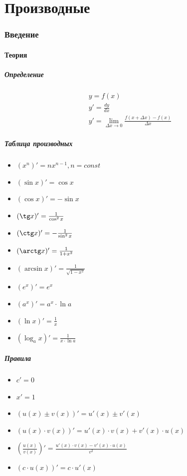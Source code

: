 \documentclass{article}
\begin{document}
\newpage
\part{Производные}

\section{Введение}

\subsection{Теория}

\subsubsection{Определение}
\begin{gather*}
    y = f(x) \\
    y' = \frac{dy}{dx} \\
    y' = \lim_{\Delta x \to 0} \frac{f(x + \Delta x) - f(x)}{\Delta x}
\end{gather*}

\subsubsection{Таблица производных}
\begin{itemize}
    \item $(x^n)' = nx^{n - 1}, n = const$
    \item $(\sin x)' = \cos x$
    \item $(\cos x)' = -\sin x$
    \item $(\tg x)'= \frac{1}{\cos^2 x}$
    \item $(\ctg x)'= - \frac{1}{\sin^2 x}$
    \item $(\arctg x)' = \frac{1}{1 + x^2}$
    \item $(\arcsin x)' = \frac{1}{\sqrt{1 - x^2}}$
    \item $(e^x)' = e^x$
    \item $(a^x)' = a^x \cdot \ln a$
    \item $(\ln x)' = \frac{1}{x}$
    \item $(\log_a x)' = \frac{1}{x \cdot \ln a}$
\end{itemize}

\subsubsection{Правила}
\begin{itemize}
    \item $c' = 0$
    \item $x' = 1$
    \item $(u(x) \pm v(x))' = u'(x) \pm v'(x)$
    \item $(u(x) \cdot v(x))' = u'(x) \cdot v(x) + v'(x) \cdot u(x)$
    \item $\left( \frac{u(x)}{v(x)} \right)' = \frac{u'(x) \cdot v(x) - v'(x) \cdot u(x)}{v^2}$
    \item $(c \cdot u(x))' = c \cdot u'(x)$
\end{itemize}
\end{document}
